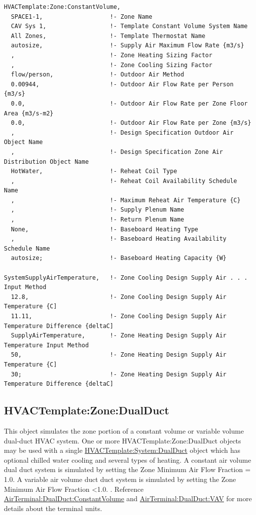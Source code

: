 \begin{lstlisting}
HVACTemplate:Zone:ConstantVolume,
  SPACE1-1,                   !- Zone Name
  CAV Sys 1,                  !- Template Constant Volume System Name
  All Zones,                  !- Template Thermostat Name
  autosize,                   !- Supply Air Maximum Flow Rate {m3/s}
  ,                           !- Zone Heating Sizing Factor
  ,                           !- Zone Cooling Sizing Factor
  flow/person,                !- Outdoor Air Method
  0.00944,                    !- Outdoor Air Flow Rate per Person {m3/s}
  0.0,                        !- Outdoor Air Flow Rate per Zone Floor Area {m3/s-m2}
  0.0,                        !- Outdoor Air Flow Rate per Zone {m3/s}
  ,                           !- Design Specification Outdoor Air Object Name
  ,                           !- Design Specification Zone Air Distribution Object Name
  HotWater,                   !- Reheat Coil Type
  ,                           !- Reheat Coil Availability Schedule Name
  ,                           !- Maximum Reheat Air Temperature {C}
  ,                           !- Supply Plenum Name
  ,                           !- Return Plenum Name
  None,                       !- Baseboard Heating Type
  ,                           !- Baseboard Heating Availability Schedule Name
  autosize;                   !- Baseboard Heating Capacity {W}

SystemSupplyAirTemperature,   !- Zone Cooling Design Supply Air . . . Input Method
  12.8,                       !- Zone Cooling Design Supply Air Temperature {C]
  11.11,                      !- Zone Cooling Design Supply Air Temperature Difference {deltaC]
  SupplyAirTemperature,       !- Zone Heating Design Supply Air Temperature Input Method
  50,                         !- Zone Heating Design Supply Air Temperature {C]
  30;                         !- Zone Heating Design Supply Air Temperature Difference {deltaC]
\end{lstlisting}

\subsection{HVACTemplate:Zone:DualDuct}\label{hvactemplatezonedualduct}

This object simulates the zone portion of a constant volume or variable volume dual-duct HVAC system. One or more HVACTemplate:Zone:DualDuct objects may be used with a single \hyperref[hvactemplatesystemdualduct]{HVACTemplate:System:DualDuct} object which has optional chilled water cooling and several types of heating. A constant air volume dual duct system is simulated by setting the Zone Minimum Air Flow Fraction = 1.0. A variable air volume duct duct system is simulated by setting the Zone Minimum Air Flow Fraction \textless{}1.0. . Reference \hyperref[airterminaldualductconstantvolume]{AirTerminal:DualDuct:ConstantVolume} and \hyperref[airterminaldualductvav]{AirTerminal:DualDuct:VAV} for more details about the terminal units.

